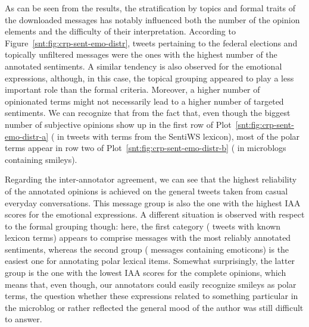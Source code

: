 As can be seen from the results, the stratification by topics and
formal traits of the downloaded messages has notably influenced both
the number of the opinion elements and the difficulty of their
interpretation.  According to Figure~\ref{snt:fig:crp-sent-emo-distr},
tweets pertaining to the federal elections and topically unfiltered
messages were the ones with the highest number of the annotated
sentiments.  A similar tendency is also observed for the emotional
expressions, although, in this case, the topical grouping appeared to
play a less important role than the formal criteria.  Moreover, a
higher number of opinionated terms might not necessarily lead to a
higher number of targeted sentiments.  We can recognize that from the
fact that, even though the biggest number of subjective opinions show
up in the first row of Plot~\ref{snt:fig:crp-sent-emo-distr-a} (\ie{}
in tweets with terms from the SentiWS lexicon), most of the polar
terms appear in row two of Plot~\ref{snt:fig:crp-sent-emo-distr-b}
(\ie{} in microblogs containing smileys).

Regarding the inter-annotator agreement, we can see that the highest
reliability of the annotated opinions is achieved on the general
tweets taken from casual everyday conversations.  This message group
is also the one with the highest IAA scores for the emotional
expressions.  A different situation is observed with respect to the
formal grouping though: here, the first category (\ie{} tweets with
known lexicon terms) appears to comprise messages with the most
reliably annotated sentiments, whereas the second group (\ie{}
messages containing emoticons) is the easiest one for annotating polar
lexical items.  Somewhat surprisingly, the latter group is the one
with the lowest IAA scores for the complete opinions, which means
that, even though, our annotators could easily recognize smileys as
polar terms, the question whether these expressions related
to something particular in the microblog or rather reflected the
general mood of the author was still difficult to answer.


